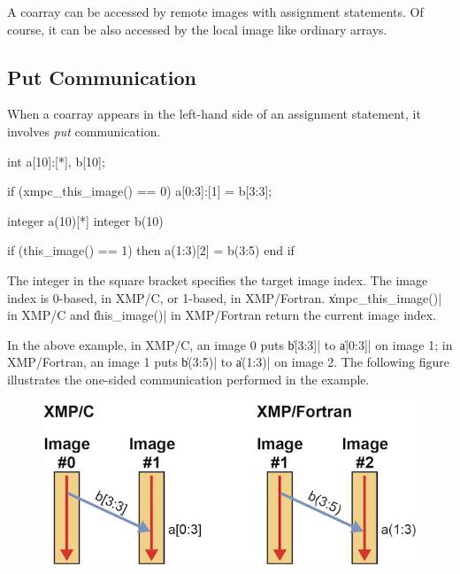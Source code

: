 A coarray can be accessed by remote images with assignment
statements. Of course, it can be also accessed by the local image like
ordinary arrays.


\subsection{Put Communication}

When a coarray appears in the left-hand side of an
assignment statement, it involves {\it put} communication.

\begin{XCexample}
int a[10]:[*], b[10];

if (xmpc_this_image() == 0)
  a[0:3]:[1] = b[3:3];
\end{XCexample}

\begin{XFexample}
integer a(10)[*]
integer b(10)

if (this_image() == 1) then
  a(1:3)[2] = b(3:5)
end if
\end{XFexample}

The integer in the square bracket specifies the target image index. The
image index is 0-based, in XMP/C, or 1-based, in
XMP/Fortran. \|xmpc_this_image()| in XMP/C and \|this_image()| in
XMP/Fortran return the current image index.



In the above example, in XMP/C, an image 0 puts \|b[3:3]| to
\|a[0:3]| on image 1; in XMP/Fortran, an image 1 puts \|b(3:5)| to
\|a(1:3)| on image 2. The following figure illustrates the one-sided
communication performed in the example.

\begin{figure}
  \centering
  \includegraphics{figs/put.png}
\end{figure}

